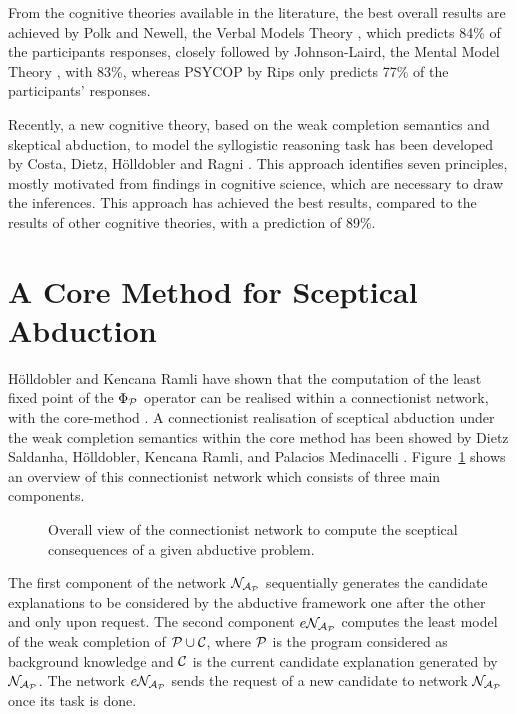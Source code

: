 From the cognitive theories available in the literature, the best overall results are achieved by Polk and Newell, the Verbal Models Theory \cite{polk1995deduction}, which predicts 84\% of the participants responses, closely followed by Johnson-Laird, the Mental Model Theory \cite{johnson1983mental}, with 83\%, whereas PSYCOP \cite{rips1994psychology} by Rips only predicts 77\% of the participants' responses. 

Recently, a new cognitive theory, based on the weak completion semantics and skeptical abduction, to model the syllogistic reasoning task has been developed by Costa, Dietz, H{\"o}lldobler and Ragni \cite{da2017computational}. This approach identifies seven principles, mostly motivated from findings in cognitive science, which are necessary to draw the inferences. This approach has achieved the best results, compared to the results of other cognitive theories, with a prediction of 89\%.

\section{A Core Method for Sceptical Abduction}

H{\"o}lldobler and Kencana Ramli \cite{holldobler2009logics} have shown that the computation of the least fixed point of the $\Phi_{\mathcal{P}}$ operator can be realised within a connectionist network, with the core-method \cite{bader2006core}. A connectionist realisation of sceptical abduction under the weak completion semantics within the core method has been showed by Dietz Saldanha, H{\"o}lldobler, Kencana Ramli, and Palacios Medinacelli \cite{corepaper}. Figure~\ref{fig:coreoverview} shows an overview of this connectionist network which consists of three main components.

\begin{figure}[h]
\begin{center}
\scalebox{0.9}{\coreoverview}
\end{center}
\caption{Overall view of the connectionist network to compute the sceptical consequences of a given abductive problem.}
\label{fig:coreoverview}
\end{figure}

The first component of the network $\mathcal{N}_{\mathcal{A}_{\mathcal{P}}}$ sequentially generates the candidate explanations to be considered by the abductive framework one after the other and only upon request. The second component $e\mathcal{N}_{\mathcal{A}_{\mathcal{P}}}$ computes the least model of the weak completion of $\mathcal{P} \cup \mathcal{C}$, where $\mathcal{P}$ is the program considered as background knowledge and $\mathcal{C}$ is the current candidate explanation generated by $\mathcal{N}_{\mathcal{A}_{\mathcal{P}}}$. The network $e\mathcal{N}_{\mathcal{A}_{\mathcal{P}}}$ sends the request of a new candidate to network $\mathcal{N}_{\mathcal{A}_{\mathcal{P}}}$ once its task is done.

